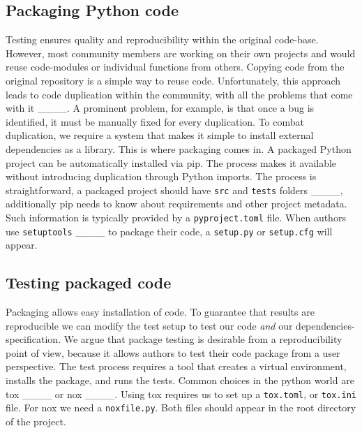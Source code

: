 \subsection{Packaging Python code}\label{sec:packaging}

Testing ensures quality and reproducibility within the original code-base.
However, most community members are working on their own projects and would reuse code-modules or individual functions from others. Copying code from the original repository is a simple way to reuse code. Unfortunately, this approach leads to code duplication within the community,
with all the problems that come with it ____. 
A prominent problem, for example, is that once a bug is identified, it must be manually fixed for every duplication. To combat duplication, we require a system that makes it simple to install external dependencies as a library. This is where packaging comes in.
A packaged Python project can be automatically installed via \ac{pip}.
The process makes it available without introducing duplication through Python imports.
The process is straightforward, a packaged project should have \texttt{src} and \texttt{tests}
folders ____, additionally \ac{pip} needs to know about requirements
and other project metadata. Such information is typically provided by a  \texttt{pyproject.toml} file. 
When authors use \texttt{setuptools} ____ to package their code,
a \texttt{setup.py} or \texttt{setup.cfg} will appear. 

\subsection{Testing packaged code}

Packaging allows easy installation of code. To guarantee that results are reproducible
we can modify the test setup to test our code \textit{and} our dependencies-specification.
We argue that package testing is desirable from a reproducibility point of view, because
it allows authors to test their code package from a user perspective. 
The test process requires a tool that creates a virtual environment, installs the package,
and runs the tests.
Common choices in the python world are tox ____ or
nox ____. Using tox requires us to set up a \texttt{tox.toml}, or \texttt{tox.ini} file.
For nox we need a \texttt{noxfile.py}. Both files should appear in the root directory of the project.

